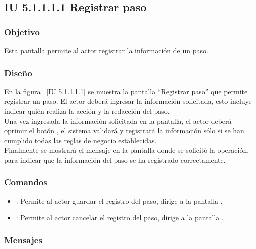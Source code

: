 \subsection{IU 5.1.1.1.1 Registrar paso}

\subsubsection{Objetivo}
	
	Esta pantalla permite al actor registrar la información de un paso.

\subsubsection{Diseño}

    En la figura ~\ref{IU 5.1.1.1.1} se muestra la pantalla ``Registrar paso'' que permite registrar un paso. El actor deberá ingresar la información solicitada, 
    esto incluye indicar quién realiza la acción y la redacción del paso.\\
    
    
    Una vez ingresada la información solicitada en la pantalla, el actor deberá oprimir el botón 
    , el sistema validará y registrará la información sólo si se han cumplido todas las reglas de negocio establecidas.  \\
    
    Finalmente se mostrará el mensaje  en la pantalla donde se solicitó la operación,
    para indicar que la información del paso
    se ha registrado correctamente.        




\subsubsection{Comandos}
\begin{itemize}
	\item {}: Permite al actor guardar el registro del paso, dirige a la pantalla .
	\item {}: Permite al actor cancelar el registro del paso, dirige a la pantalla .
\end{itemize}

\subsubsection{Mensajes}

